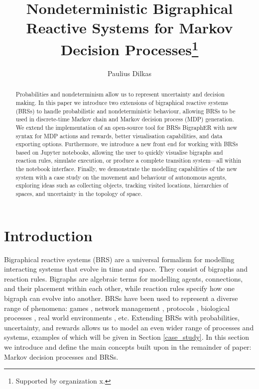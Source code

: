 \documentclass[runningheads]{llncs}
\begin{document}
\title{Nondeterministic Bigraphical Reactive Systems for Markov Decision
  Processes\thanks{Supported by organization x.}}
\author{Paulius Dilkas}
\maketitle

\begin{abstract}
  Probabilities and nondeterminism allow us to represent uncertainty and
  decision making. In this paper we introduce two extensions of bigraphical
  reactive systems (BRSs) to handle probabilistic and nondeterministic
  behaviour, allowing BRSs to be used in discrete-time Markov chain and Markov
  decision process (MDP) generation. We extend the implementation of an
  open-source tool for BRSs BigraphER with new syntax for MDP actions and
  rewards, better visualisation capabilities, and data exporting options.
  Furthermore, we introduce a new front end for working with BRSs based on
  Jupyter notebooks, allowing the user to quickly visualise bigraphs and
  reaction rules, simulate execution, or produce a complete transition
  system---all within the notebook interface. Finally, we demonstrate the
  modelling capabilities of the new system with a case study on the movement and
  behaviour of autonomous agents, exploring ideas such as collecting objects,
  tracking visited locations, hierarchies of spaces, and uncertainty in the
  topology of space.

\end{abstract}

\section{Introduction}

Bigraphical reactive systems (BRS) \cite{DBLP:books/daglib/0022395} are a
universal formalism for modelling interacting systems that evolve in time and
space. They consist of bigraphs and reaction rules. Bigraphs are algebraic terms
for modelling agents, connections, and their placement within each other, while
reaction rules specify how one bigraph can evolve into another. BRSs have
been used to represent a diverse range of phenomena: games
\cite{DBLP:journals/tochi/BenfordCRS16}, network management
\cite{DBLP:journals/scp/CalderKSS14}, protocols
\cite{DBLP:journals/fac/CalderS14}, biological processes
\cite{DBLP:journals/entcs/KrivineMT08}, real world environments
\cite{DBLP:conf/giscience/WaltonW12}, etc. Extending BRSs with probabilities,
uncertainty, and rewards allows us to model an even wider range of processes and
systems, examples of which will be given in Section \ref{case_study}. In this
section we introduce and define the main concepts built upon in the remainder of
paper: Markov decision processes and BRSs.
\end{document}
